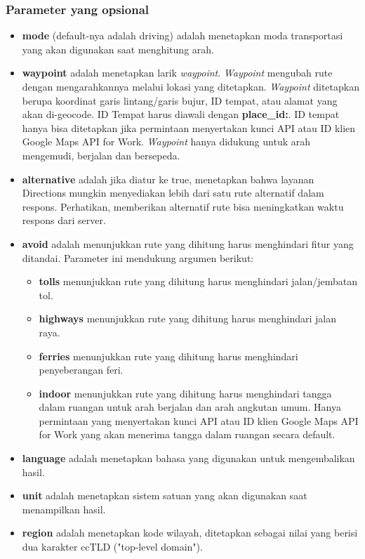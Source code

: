 \subsubsection{Parameter yang opsional}
\label{subsubsec:parameteropsional}
\begin{itemize}
	\item \textbf{mode} (default-nya adalah driving) adalah menetapkan moda transportasi yang akan digunakan saat menghitung arah. 
	\item \textbf{waypoint} adalah menetapkan larik \textit{waypoint}. \textit{Waypoint} mengubah rute dengan mengarahkannya melalui lokasi yang ditetapkan. \textit{Waypoint} ditetapkan berupa koordinat garis lintang/garis bujur, ID tempat, atau alamat yang akan di-geocode. ID Tempat harus diawali dengan \textbf{place\_id:}. ID tempat hanya bisa ditetapkan jika permintaan menyertakan kunci API atau ID klien Google Maps API for Work. \textit{Waypoint} hanya didukung untuk arah mengemudi, berjalan dan bersepeda.
	\item \textbf{alternative} adalah jika diatur ke true, menetapkan bahwa layanan Directions mungkin menyediakan lebih dari satu rute alternatif dalam respons. Perhatikan, memberikan alternatif rute bisa meningkatkan waktu respons dari server.
	\item \textbf{avoid} adalah menunjukkan rute yang dihitung harus menghindari fitur yang ditandai. Parameter ini mendukung argumen berikut: 
	\begin{itemize}
		\item \textbf{tolls} menunjukkan rute yang dihitung harus menghindari jalan/jembatan tol.
		\item \textbf{highways} menunjukkan rute yang dihitung harus menghindari jalan raya.
		\item \textbf{ferries} menunjukkan rute yang dihitung harus menghindari penyeberangan feri.
		\item \textbf{indoor} menunjukkan rute yang dihitung harus menghindari tangga dalam ruangan untuk arah berjalan dan arah angkutan umum. Hanya permintaan yang menyertakan kunci API atau ID klien Google Maps API for Work yang akan menerima tangga dalam ruangan secara default.
	\end{itemize}
	\item \textbf{language} adalah menetapkan bahasa yang digunakan untuk mengembalikan hasil.
	\item \textbf{unit} adalah menetapkan sistem satuan yang akan digunakan saat menampilkan hasil.
	\item \textbf{region} adalah menetapkan kode wilayah, ditetapkan sebagai nilai yang berisi dua karakter ccTLD ("top-level domain").

\end{itemize}
